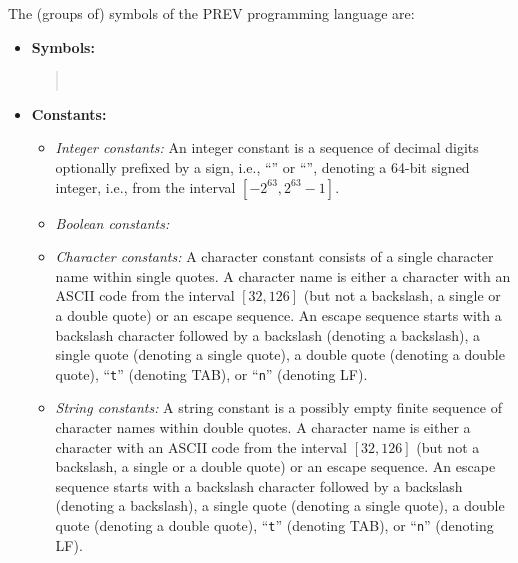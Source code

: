 \documentclass[10pt]{article}
\begin{document}
The (groups of) symbols of the PREV programming language are:
\begin{itemize}
\item \textbf{Symbols:}
\begin{quote}
\ \ \ \ \ \ \ \ \ \ \ \ \ \ \ \ \ \ \ \ \ \ \ \ \ \ \ \ \ \ \ \ \ \ \ \ \ \ \ \ \ \ \ \ \ \ \ \ \ \ 
\end{quote}
\item \textbf{Constants:}
\begin{itemize}
\item \textit{Integer constants:} An integer constant is a sequence of decimal digits optionally prefixed by a sign, i.e., ``\texttt{}'' or ``\texttt{}'', denoting a 64-bit signed integer, i.e., from the interval $ [-2^{63},2^{63}-1] $.
\item \textit{Boolean constants:} \ \ 
\item \textit{Character constants:} A character constant consists of a single character name within single quotes.  A character name is either a character with an ASCII code from the interval $[32,126]$ (but not a backslash, a single or a double quote) or an escape sequence.  An escape sequence starts with a backslash character followed by a backslash (denoting a backslash), a single quote (denoting a single quote), a double quote (denoting a double quote), ``\texttt{t}'' (denoting TAB), or ``\texttt{n}'' (denoting LF).
\item \textit{String constants:} A string constant is a possibly empty finite sequence of character names within double quotes.  A character name is either a character with an ASCII code from the interval $[32,126]$ (but not a backslash, a single or a double quote) or an escape sequence.  An escape sequence starts with a backslash character followed by a backslash (denoting a backslash), a single quote (denoting a single quote), a double quote (denoting a double quote), ``\texttt{t}'' (denoting TAB), or ``\texttt{n}'' (denoting LF).

\end{itemize}
\end{itemize}
\end{document}
